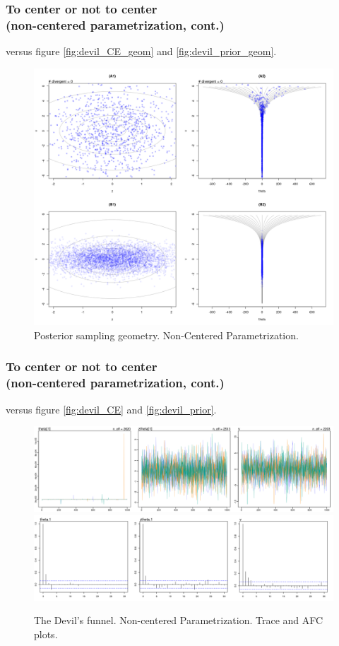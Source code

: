 \documentclass[arial,12pt,xcolor=dvipsnames]{beamer}
\begin{document}
%
\begin{frame}
	\frametitle{To center or not to center \\
		(non-centered parametrization, cont.)}
	versus figure \ref{fig:devil_CE_geom} and \ref{fig:devil_prior_geom}.
	\begin{figure}[h]
		\centering
		\includegraphics[width=0.60\linewidth]{3_funnel_NC}
		\caption{Posterior sampling geometry. Non-Centered Parametrization.}
		\label{fig:devil_NC_geom}
	\end{figure}
\end{frame}
%
\begin{frame}
	\frametitle{To center or not to center \\
		(non-centered parametrization, cont.)}
	versus figure \ref{fig:devil_CE} and \ref{fig:devil_prior}.
	\begin{figure}[h] 
		\centering
			\includegraphics[width=0.85\linewidth]{3_trace_NC}
			\includegraphics[width=0.88\linewidth]{3_acf_NC}
		\caption{The Devil's funnel. Non-centered Parametrization. Trace and AFC plots.}
		\label{fig:devil_NC}
	\end{figure}
\end{frame}
\end{document}
